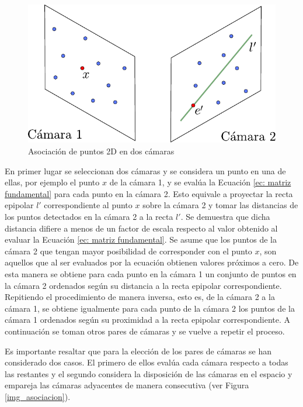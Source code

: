 \begin{figure}[H]
\begin{center}
\includegraphics[scale=0.7]{img/Reconstruccion/cam2cam.pdf}
\end{center}
\caption{Asociación de puntos 2D en dos cámaras}
\label{fig: cam2cam }
\end{figure}

En primer lugar se seleccionan dos cámaras y se considera un punto en una de ellas, por ejemplo el punto $x$ de la cámara 1, y se evalúa la Ecuación \ref{ec: matriz fundamental} para cada punto en la cámara 2. Esto equivale a proyectar la recta epipolar $l'$ correspondiente al punto $x$ sobre la cámara 2  y tomar las distancias de los puntos detectados en la cámara 2 a la recta $l'$. Se demuestra que dicha distancia difiere a menos de un factor de escala respecto al valor obtenido al evaluar la Ecuación \ref{ec: matriz fundamental}. Se asume que los puntos de la cámara 2 que tengan mayor posibilidad de corresponder con el punto $x$, son aquellos que al ser evaluados por la ecuación obtienen valores próximos a cero.
De esta manera se obtiene para cada punto en la cámara 1 un conjunto de puntos en la cámara 2 ordenados según su distancia a la recta epipolar correspondiente.
Repitiendo el procedimiento de manera inversa, esto es, de la cámara 2 a la cámara 1, se obtiene igualmente para cada punto de la cámara 2  los puntos de la cámara 1 ordenados según su proximidad a la recta epipolar correspondiente. A continuación se toman otros pares de cámaras y se vuelve a repetir el proceso. 

Es importante resaltar que para la elección de los pares de cámaras se han considerado dos casos.
El primero de ellos evalúa cada cámara respecto a todas las restantes y el segundo considera la disposición de las cámaras en el espacio y empareja las cámaras adyacentes de manera consecutiva (ver Figura \ref{img_asociacion}). %

